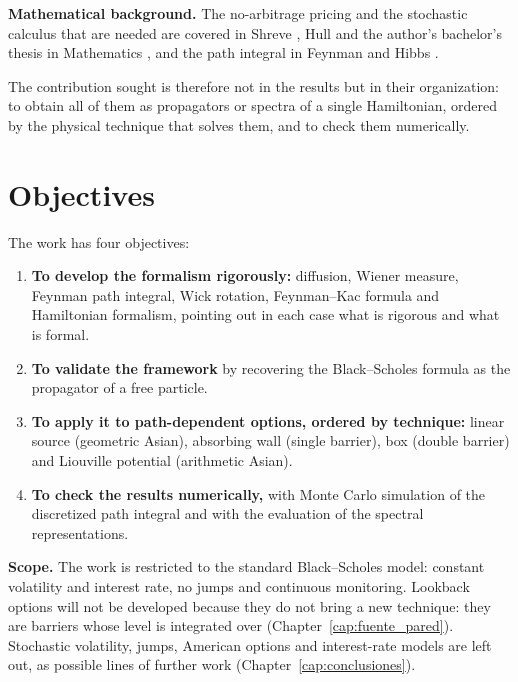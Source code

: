 \medskip

\noindent\textbf{Mathematical background.}
The no-arbitrage pricing and the stochastic calculus that are needed are
covered in Shreve \cite{shreve}, Hull \cite{hull} and the author's bachelor's
thesis in Mathematics \cite{tfgm}, and the path integral in Feynman and
Hibbs \cite{feynman-hibbs}.

\medskip

The contribution sought is therefore not in the results but in their
organization: to obtain all of them as propagators or spectra of a
single Hamiltonian, ordered by the physical technique that solves them,
and to check them numerically.

\section{Objectives}
\label{sec:objetivos}

The work has four objectives:
\begin{enumerate}[leftmargin=*, label=\arabic*., itemsep=1pt, topsep=3pt]
 \item \textbf{To develop the formalism rigorously:} diffusion, Wiener
 measure, Feynman path integral, Wick rotation, Feynman--Kac formula and
 Hamiltonian formalism, pointing out in each case what is rigorous and
 what is formal.
 \item \textbf{To validate the framework} by recovering the
 Black--Scholes formula as the propagator of a free particle.
 \item \textbf{To apply it to path-dependent options, ordered by
 technique:} linear source (geometric Asian), absorbing wall (single
 barrier), box (double barrier) and Liouville potential (arithmetic
 Asian).
 \item \textbf{To check the results numerically,} with Monte Carlo
 simulation of the discretized path integral and with the evaluation of
 the spectral representations.
\end{enumerate}

\noindent\textbf{Scope.}
The work is restricted to the standard Black--Scholes model: constant
volatility and interest rate, no jumps and continuous monitoring.
Lookback options will not be developed because they do not bring a new
technique: they are barriers whose level is integrated over
(Chapter~\ref{cap:fuente_pared}\enprep). Stochastic volatility, jumps,
American options and interest-rate models are left out, as possible
lines of further work (Chapter~\ref{cap:conclusiones}\enprep).

